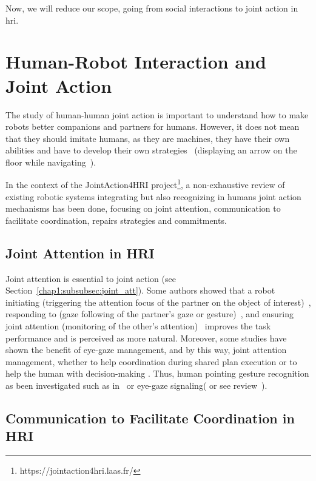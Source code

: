 \documentclass[a4paper,11pt,twoside]{StyleThese}
\begin{document}
Now, we will reduce our scope, going from social interactions to joint action in \acrshort{hri}. 

\section{Human-Robot Interaction and Joint Action}\label{chap2:sec:hri_ja}
The study of human-human joint action is important to understand how to make robots better companions and partners for humans. However, it does not mean that they should imitate humans, as they are machines, they have their own abilities and have to develop their own strategies~\cite{bradshaw_2017_human} (\eg displaying an arrow on the floor while navigating~\cite{chadalavada_2015_mind, coovert_2014_spatial}).

In the context of the JointAction4HRI project\footnote{https://jointaction4hri.laas.fr/}, a non-exhaustive review of existing robotic systems integrating but also recognizing in humans joint action mechanisms has been done, focusing on joint attention, communication to facilitate coordination, repairs strategies and commitments.

\subsection{Joint Attention in HRI}
Joint attention is essential to joint action (see Section~\ref{chap1:subsubsec:joint_att}). Some authors showed that a robot initiating (\ie triggering the attention focus of the partner on the object of interest)~\cite{imai_2003_physical}, responding to (\ie gaze following of the partner's gaze or gesture)~\cite{yu_2010_investigating}, and ensuring joint attention (\ie monitoring of the other's attention)~\cite{huang_2010_joint} improves the task performance and is perceived as more natural. Moreover, some studies have shown the benefit of eye-gaze management, and by this way, joint attention management, whether to help coordination during shared plan execution \cite{lallee_2013_cooperative} or to help the human with decision-making \cite{boucher_2010_facilitation, boucher_2012_reach}. Thus, human pointing gesture recognition as been investigated such as in~\cite{nickel_2007_visual} or eye-gaze signaling(\eg \cite{staudte_2009_visual} or see review~\cite{admoni_2017_social}).

\subsection{Communication to Facilitate Coordination in HRI}
\end{document}
